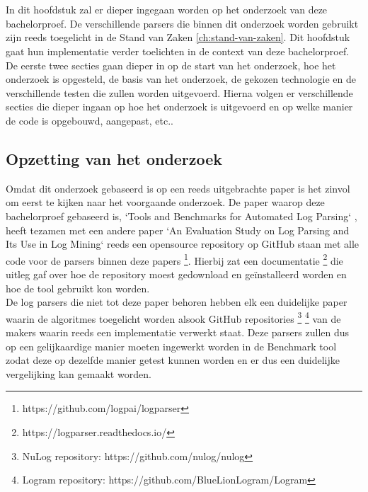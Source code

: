 
\chapter{}
\label{ch:methodologie}


In dit hoofdstuk zal er dieper ingegaan worden op het onderzoek van deze bachelorproef. De verschillende parsers die binnen dit onderzoek worden gebruikt zijn reeds toegelicht in de Stand van Zaken \ref{ch:stand-van-zaken}. Dit hoofdstuk gaat hun implementatie verder toelichten in de context van deze bachelorproef. De eerste twee secties gaan dieper in op de start van het onderzoek, hoe het onderzoek is opgesteld, de basis van het onderzoek, de gekozen technologie en de verschillende testen die zullen worden uitgevoerd. Hierna volgen er verschillende secties die dieper ingaan op hoe het onderzoek is uitgevoerd en op welke manier de code is opgebouwd, aangepast, etc..


\section{Opzetting van het onderzoek}
Omdat dit onderzoek gebaseerd is op een reeds uitgebrachte paper is het zinvol om eerst te kijken naar het voorgaande onderzoek. De paper waarop deze bachelorproef gebaseerd is, `Tools and Benchmarks for Automated Log Parsing` \autocite{TBA2019}, heeft tezamen met een andere paper `An Evaluation Study on Log Parsing and Its Use in Log Mining` \autocite{he2016evaluation} reeds een opensource repository op GitHub staan met alle code voor de parsers binnen deze papers \footnote{https://github.com/logpai/logparser}. Hierbij zat een documentatie \footnote{https://logparser.readthedocs.io/} die uitleg gaf over hoe de repository moest gedownload en geïnstalleerd worden en hoe de tool gebruikt kon worden.\\

De log parsers die niet tot deze paper behoren hebben elk een duidelijke paper waarin de algoritmes toegelicht worden alsook GitHub repositories \footnote{NuLog repository: https://github.com/nulog/nulog} \footnote{Logram repository: https://github.com/BlueLionLogram/Logram} van de makers waarin reeds een implementatie verwerkt staat. Deze parsers zullen dus op een gelijkaardige manier moeten ingewerkt worden in de Benchmark tool zodat deze op dezelfde manier getest kunnen worden en er dus een duidelijke vergelijking kan gemaakt worden.\\

